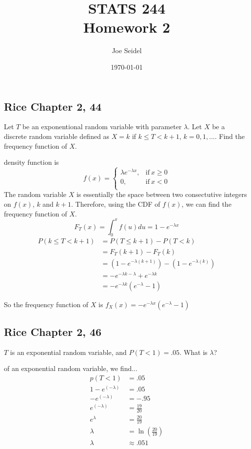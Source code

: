 \documentclass{tufte-book}
\title{STATS 244 \\ Homework 2}
\author{Joe Seidel}
\date{\today}
\theoremstyle{mytheoremstyle}
\theoremstyle{mylemstyle}
\theoremstyle{mydefstyle}
\begin{document}
\maketitle
{}
\newpage
{}

\subsection{Rice Chapter 2, 44}
Let $T$ be an exponentional random variable with parameter $\lambda$.   Let $X$ be a discrete random variable defined as $X=k$ if $k \leq T <k+1$, $k=0,1,...$. Find the frequency function of $X$.

 density function is
\[ f(x)=
\begin{cases}
      \lambda e^{-\lambda x},  & \text{if}\ x \geq 0\\
      0, & \text{if}\ x<0\\
\end{cases}
\]
The random variable $X$ is essentially the space between two consectutive integers on $f(x)$, $k$ and $k+1$.  Therefore, using the CDF of $f(x)$, we can find the frequency function of $X$.
\[F_T(x)=\int_{0}^{x}f(u)du=1-e^{-\lambda x}\]
\begin{align*}
P(k\leq T<k+1) &= P(T \leq k+1) - P(T<k)\\
&= F_T(k+1) - F_T(k)\\
&= (1-e^{-\lambda(k+1)}) - (1-e^{-\lambda(k)})\\
&= -e^{-\lambda k- \lambda}+e^{-\lambda k}\\
&= -e^{-\lambda k}(e^{-\lambda}-1)
\end{align*}

So the frequency function of $X$ is $f_X(x)=  -e^{-\lambda x}(e^{-\lambda}-1)$


\subsection{Rice Chapter 2, 46}
$T$ is an exponential random variable, and $P(T<1) = .05$.  What is $\lambda$?

 of an exponential random variable, we find...
\begin{align*}
p(T<1)&=.05\\
1-e^(-\lambda) &= .05\\
-e^(-\lambda) &= -.95\\
e^(-\lambda) &= \frac{19}{20}\\
e^{\lambda} &= \frac{20}{19}\\
\lambda &= \ln(\frac{20}{19})\\
\lambda &\approx .051
\end{align*}
\end{document}
